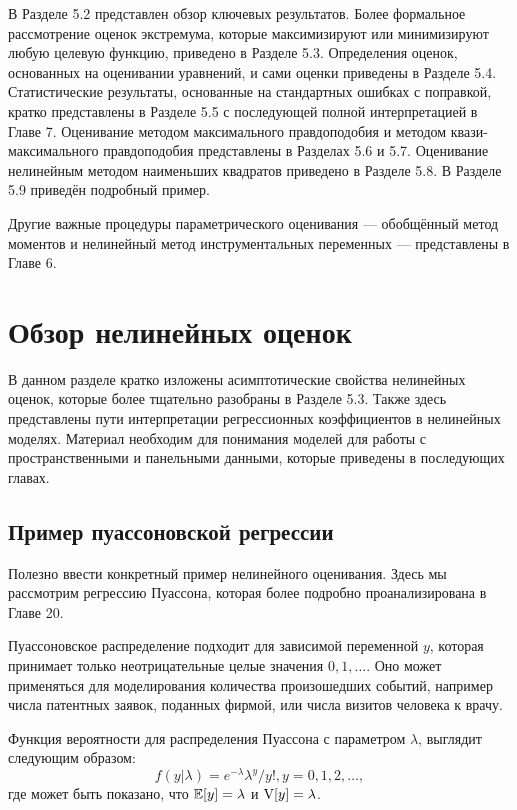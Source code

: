 В Разделе 5.2 представлен обзор ключевых результатов. Более формальное рассмотрение оценок экстремума, которые максимизируют или минимизируют любую целевую функцию, приведено в Разделе 5.3. Определения оценок, основанных на оценивании уравнений, и сами оценки приведены в Разделе 5.4. Статистические результаты, основанные на стандартных ошибках с поправкой, кратко представлены в Разделе 5.5 с последующей полной интерпретацией в Главе 7. Оценивание методом максимального правдоподобия и методом квази-максимального правдоподобия представлены в Разделах 5.6 и 5.7. Оценивание нелинейным методом наименьших квадратов приведено в Разделе 5.8. В Разделе 5.9 приведён подробный пример. 

Другие важные процедуры параметрического оценивания --- обобщённый метод моментов и нелинейный метод инструментальных переменных --- представлены в Главе 6.

\section{Обзор нелинейных оценок}

В данном разделе кратко изложены асимптотические свойства нелинейных оценок, которые более тщательно разобраны в Разделе 5.3. Также здесь представлены пути интерпретации регрессионных коэффициентов в нелинейных моделях. Материал необходим для понимания моделей для работы с пространственными и панельными данными, которые приведены в последующих главах.

\subsection{Пример пуассоновской регрессии}

Полезно ввести конкретный пример нелинейного оценивания. Здесь мы рассмотрим регрессию Пуассона, которая более подробно проанализирована в Главе 20.

Пуассоновское распределение подходит для зависимой переменной $y$, которая принимает только неотрицательные целые значения $0,1, \dots$. Оно может применяться для моделирования количества произошедших событий, например числа патентных заявок, поданных фирмой, или числа визитов человека к врачу.

Функция вероятности для распределения Пуассона с параметром $\lambda$, выглядит следующим образом:
\[
f(y|\lambda)= e^{-\lambda}\lambda^{y} / y! , y = 0,1,2, \dots,
\]
где может быть показано, что $\mathbb{E}[y]=\lambda$ и $\mathrm{V}[y]=\lambda$.

